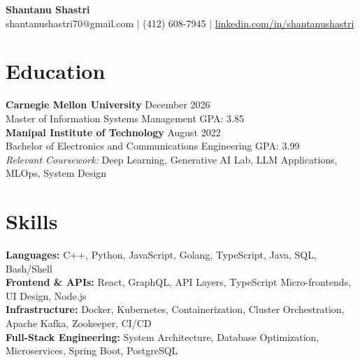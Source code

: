 \documentclass[11pt,a4paper]{article}
\begin{document}
\begin{center}
    \Huge \textbf{Shantanu Shastri} \\
    \vspace{2pt}
    \small shantanushastri70@gmail.com $|$ (412) 608-7945 $|$ \href{https://linkedin.com/in/shantanushastri}{linkedin.com/in/shantanushastri}
\end{center}

\vspace{-5pt}
\section{Education}
\noindent
\textbf{Carnegie Mellon University} \hfill December 2026 \\
Master of Information Systems Management \hfill GPA: 3.85 \\
\textbf{Manipal Institute of Technology} \hfill August 2022 \\
Bachelor of Electronics and Communications Engineering \hfill GPA: 3.99 \\
\textit{Relevant Coursework:} Deep Learning, Generative AI Lab, LLM Applications, MLOps, System Design

\vspace{-5pt}
\section{Skills}
\noindent
\textbf{Languages:} C++, Python, JavaScript, Golang, TypeScript, Java, SQL, Bash/Shell \\
\textbf{Frontend \& APIs:} React, GraphQL, API Layers, TypeScript Micro-frontends, UI Design, Node.js \\
\textbf{Infrastructure:} Docker, Kubernetes, Containerization, Cluster Orchestration, Apache Kafka, Zookeeper, CI/CD \\
\textbf{Full-Stack Engineering:} System Architecture, Database Optimization, Microservices, Spring Boot, PostgreSQL

\vspace{-5pt}
\end{document}
